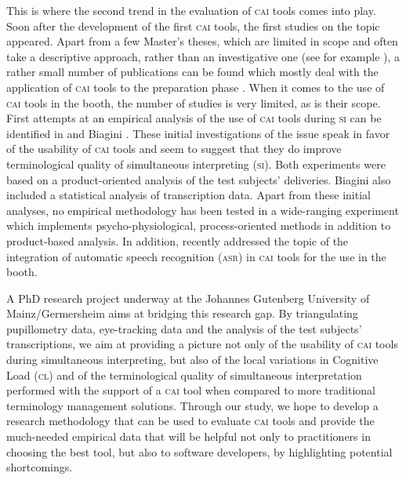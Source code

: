 \documentclass[output=paper]{langsci/langscibook}
\begin{document}
This is where the second trend in the evaluation of \textsc{cai} tools comes into play. Soon after the development of the first \textsc{cai} tools, the first studies on the topic appeared. Apart from a few Master’s theses, which are limited in scope and often take a descriptive approach, rather than an investigative one (see for example \citet{DeMerulis2013}), a rather small number of publications can be found which mostly deal with the application of \textsc{cai} tools to the preparation phase \citep{Xu2015, Fantinuoli2017a}. When it comes to the use of \textsc{cai} tools in the booth, the number of studies is very limited, as is their scope. First attempts at an empirical analysis of the use of \textsc{cai} tools during \textsc{si} can be identified in \citet{Prandi2015a, Prandi2015b} and Biagini \citet{Biagini2015}. These initial investigations of the issue speak in favor of the usability of \textsc{cai} tools and seem to suggest that they do improve terminological quality of simultaneous interpreting (\textsc{si}). Both experiments were based on a product-oriented analysis of the test subjects’ deliveries. Biagini also included a statistical analysis of transcription data. Apart from these initial analyses, no empirical methodology has been tested in a wide-ranging experiment which implements psycho-physiological, process-oriented methods in addition to product-based analysis. In addition, \citet{Fantinuoli2017b} recently addressed the topic of the integration of automatic speech recognition (\textsc{asr}) in \textsc{cai} tools for the use in the booth.

A PhD research project underway at the Johannes Gutenberg University of Mainz/Germersheim \citep{Prandi2016, Prandi2017a, Prandi2017b} aims at bridging this research gap. By triangulating pupillometry data, eye-tracking data and the analysis of the test subjects’ transcriptions, we aim at providing a picture not only of the usability of \textsc{cai} tools during simultaneous interpreting, but also of the local variations in Cognitive Load (\textsc{cl}) and of the terminological quality of simultaneous interpretation performed with the support of a \textsc{cai} tool when compared to more traditional terminology management solutions. Through our study, we hope to develop a research methodology that can be used to evaluate \textsc{cai} tools and provide the much-needed empirical data that will be helpful not only to practitioners in choosing the best tool, but also to software developers, by highlighting potential shortcomings.
\end{document}
